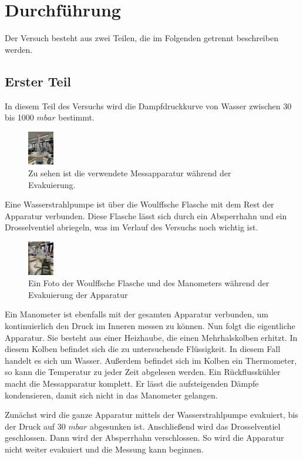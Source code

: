 \section{Durchführung}
\label{sec:Durchführung}

Der Versuch besteht aus zwei Teilen, die im Folgenden getrennt beschreiben werden.
\subsection{Erster Teil}
In diesem Teil des Versuchs wird die Dampfdruckkurve von Wasser zwischen 30 bis 1000 $mbar$ bestimmt.
\begin{figure}
    \centering
    \includegraphics[height=1.5cm]{content/Verwendete_Messapparatur.jpeg}
    \caption{Zu sehen ist die verwendete Messapparatur während der Evakuierung.}
    \label{Abb:Messapparatur}
\end{figure}
Eine Wasserstrahlpumpe ist über die Woulffsche Flasche mit dem Rest der Apparatur verbunden.
Diese Flasche lässt sich durch ein Absperrhahn und ein Drosselventiel abriegeln, was im Verlauf des Versuchs noch wichtig ist.
\begin{figure}
    \centering
    \includegraphics[height=1.5cm]{content/Woulffsche_Flasche.jpeg}
    \caption{Ein Foto der Woulffsche Flasche und des Manometers während der Evakuierung der Apparatur}
    \label{Abb:Woulffsche_Flasche}
\end{figure}
Ein Manometer ist ebenfalls mit der gesamten Apparatur verbunden, um kontinuierlich den Druck im Inneren messen zu können.
Nun folgt die eigentliche Apparatur.
Sie besteht aus einer Heizhaube, die einen Mehrhalskolben erhitzt.
In diesem Kolben befindet sich die zu untersuchende Flüssigkeit.
In diesem Fall handelt es sich um Wasser.
Außerdem befindet sich im Kolben ein Thermometer, so kann die Temperatur zu jeder Zeit abgelesen werden.
Ein Rückflusskühler macht die Messapparatur komplett.
Er lässt die aufsteigenden Dämpfe kondensieren, damit sich nicht in das Manometer gelangen.

Zunächst wird die ganze Apparatur mittels der Wasserstrahlpumpe evakuiert, bis der Druck auf 30 $mbar$ abgesunken ist.
Anschließend wird das Drosselventiel geschlossen.
Dann wird der Absperrhahn verschlossen.
So wird die Apparatur nicht weiter evakuiert und die Messung kann beginnen.

